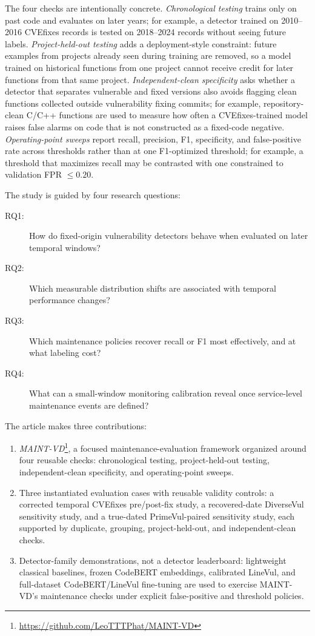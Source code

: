 \documentclass[a4paper,fleqn]{cas-dc}
\begin{document}
The four checks are intentionally concrete. \emph{Chronological testing} trains
only on past code and evaluates on later years; for example, a detector trained
on 2010--2016 CVEfixes records is tested on 2018--2024 records without seeing
future labels. \emph{Project-held-out testing} adds a deployment-style
constraint: future examples from projects already seen during training are
removed, so a model trained on historical functions from one project cannot
receive credit for later functions from that same project. \emph{Independent-clean
specificity} asks whether a detector that separates vulnerable and fixed
versions also avoids flagging clean functions collected outside vulnerability
fixing commits; for example, repository-clean C/C++ functions are used to
measure how often a CVEfixes-trained model raises false alarms on code that is
not constructed as a fixed-code negative. \emph{Operating-point sweeps} report
recall, precision, F1, specificity, and false-positive rate across thresholds
rather than at one F1-optimized threshold; for example, a threshold that
maximizes recall may be contrasted with one constrained to validation FPR
\(\leq 0.20\).

The study is guided by four research questions:

\begin{description}
  \item[RQ1:] How do fixed-origin vulnerability detectors behave when evaluated
  on later temporal windows?
  \item[RQ2:] Which measurable distribution shifts are associated with temporal
  performance changes?
  \item[RQ3:] Which maintenance policies recover recall or F1 most effectively,
  and at what labeling cost?
  \item[RQ4:] What can a small-window monitoring calibration reveal once
  service-level maintenance events are defined?
\end{description}

The article makes three contributions:

\begin{enumerate}
  \item \emph{MAINT-VD}\footnote{\url{https://github.com/LeoTTTPhat/MAINT-VD}},
  a focused maintenance-evaluation framework organized
  around four reusable checks: chronological testing, project-held-out testing,
  independent-clean specificity, and operating-point sweeps.
  \item Three instantiated evaluation cases with reusable validity controls: a
  corrected temporal CVEfixes pre/post-fix study, a recovered-date DiverseVul
  sensitivity study, and a true-dated PrimeVul-paired sensitivity study, each
  supported by duplicate, grouping, project-held-out, and independent-clean
  checks.
  \item Detector-family demonstrations, not a detector leaderboard: lightweight
  classical baselines, frozen CodeBERT embeddings, calibrated LineVul, and
  full-dataset CodeBERT/LineVul fine-tuning are used to exercise MAINT-VD's
  maintenance checks under explicit false-positive and threshold policies.
\end{enumerate}
\end{document}
